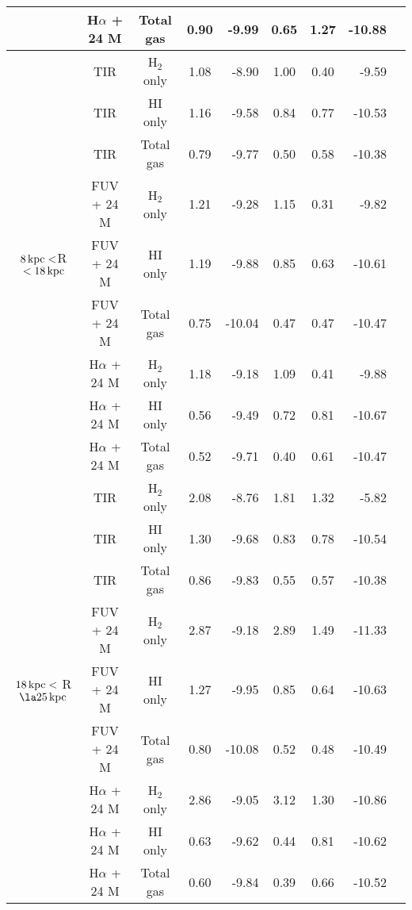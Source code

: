 \documentclass[useAMS,usenatbib]{mn2e}
\newcommand \kpc        {\,{\rm kpc}}
\begin{document}
\begin{table*}
\begin{tabular}{ccccrccrr}
 & H$\alpha$ + 24 M & Total gas  & 0.90 & -9.99  & 0.65    & 1.27    & -10.88    \\
\hline
\multicolumn{1}{c}{\multirow{9}{*}{$8\kpc < $R $< 18\kpc$}} & TIR               & H$_2$ only & 1.08 & -8.90  & 1.00    & 0.40    & -9.59      \\
 & TIR               & HI only    & 1.16 & -9.58  & 0.84    & 0.77    & -10.53     \\
 & TIR               & Total gas  & 0.79 & -9.77  & 0.50    & 0.58    & -10.38     \\
 & FUV + 24 M       & H$_2$ only & 1.21 & -9.28  & 1.15    & 0.31    & -9.82      \\
 & FUV + 24 M       & HI only    & 1.19 & -9.88  & 0.85    & 0.63    & -10.61     \\
 & FUV + 24 M       & Total gas  & 0.75 & -10.04 & 0.47    & 0.47    & -10.47     \\
 & H$\alpha$ + 24 M & H$_2$ only & 1.18 & -9.18  & 1.09    & 0.41    & -9.88      \\
 & H$\alpha$ + 24 M & HI only    & 0.56 & -9.49  & 0.72    & 0.81    & -10.67     \\
 & H$\alpha$ + 24 M & Total gas  & 0.52 & -9.71  & 0.40    & 0.61    & -10.47  \\
\hline
\multicolumn{1}{c}{\multirow{9}{*}{$18\kpc <$ R $\la 25\kpc$}} & TIR               & H$_2$ only & 2.08 & -8.76  & 1.81    & 1.32    & -5.82      \\
 & TIR               & HI only    & 1.30 & -9.68  & 0.83    & 0.78    & -10.54     \\
 & TIR               & Total gas  & 0.86 & -9.83  & 0.55    & 0.57    & -10.38     \\
 & FUV + 24 M       & H$_2$ only & 2.87 & -9.18  & 2.89    & 1.49    & -11.33     \\
 & FUV + 24 M       & HI only    & 1.27 & -9.95  & 0.85    & 0.64    & -10.63     \\
 & FUV + 24 M       & Total gas  & 0.80 & -10.08 & 0.52    & 0.48    & -10.49     \\
 & H$\alpha$ + 24 M & H$_2$ only & 2.86 & -9.05  & 3.12    & 1.30    & -10.86     \\
 & H$\alpha$ + 24 M & HI only    & 0.63 & -9.62  & 0.44    & 0.81    & -10.62     \\
 & H$\alpha$ + 24 M & Total gas  & 0.60 & -9.84  & 0.39    & 0.66    & -10.52     \\
 \hline
\end{tabular}
\end{table*}
\end{document}
